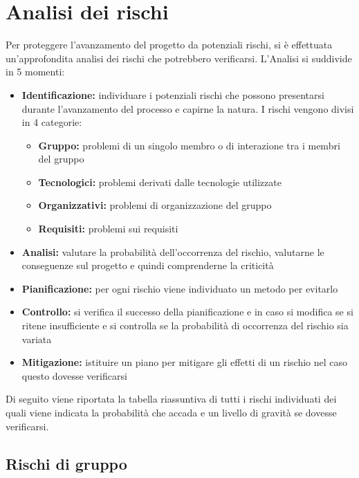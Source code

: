 \documentclass[12pt,a4paper]{article}
\begin{document}
\newpage

\section{Analisi dei rischi}

Per proteggere l’avanzamento del progetto da potenziali rischi, si è effettuata un’approfondita analisi dei rischi che potrebbero verificarsi. L’Analisi si suddivide in 5 momenti:
\begin{itemize}
	\item \textbf{Identificazione:} individuare i potenziali rischi che possono presentarsi durante l’avanzamento del processo e capirne la natura. I rischi vengono divisi in 4 categorie:
	\begin{itemize}
		\item \textbf{Gruppo:} problemi di un singolo membro o di interazione tra i membri del gruppo
		\item \textbf{Tecnologici:} problemi derivati dalle tecnologie utilizzate
		\item \textbf{Organizzativi:} problemi di organizzazione del gruppo
		\item \textbf{Requisiti:} problemi sui requisiti
	\end{itemize}
	\item \textbf{Analisi:} valutare la probabilità dell’occorrenza del rischio, valutarne le conseguenze sul progetto e quindi comprenderne la criticità
	\item \textbf{Pianificazione:} per ogni rischio viene individuato un metodo per evitarlo
	\item \textbf{Controllo:} si verifica il successo della pianificazione e in caso si modifica se si ritene insufficiente e si controlla se la probabilità di occorrenza del rischio sia variata
	\item \textbf{Mitigazione:} istituire un piano per mitigare gli effetti di un rischio nel caso questo dovesse verificarsi
\end{itemize}

Di seguito viene riportata la tabella riassuntiva di tutti i rischi individuati dei quali viene indicata la probabilità che accada e un livello di gravità se dovesse verificarsi.

\subsection{Rischi di gruppo}
\end{document}
